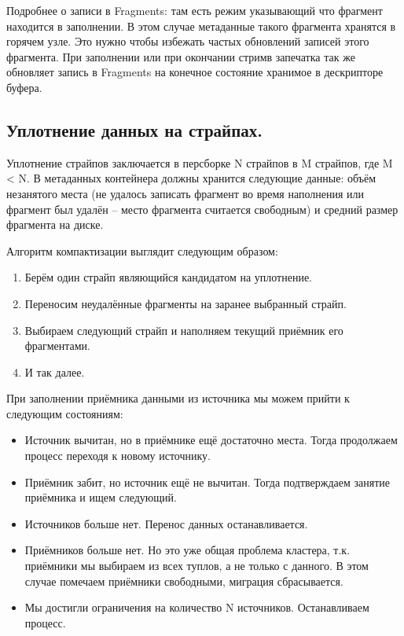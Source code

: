 Подробнее о записи в Fragments: там есть режим указывающий что фрагмент
находится в заполнении. В этом случае метаданные такого фрагмента
хранятся в горячем узле. Это нужно чтобы избежать частых обновлений
записей этого фрагмента. При заполнении или при окончании стримв
запечатка так же обновляет запись в Fragments на конечное состояние
хранимое в дескрипторе буфера.

\subsection{Уплотнение данных на
страйпах.}\label{ux443ux43fux43bux43eux442ux43dux435ux43dux438ux435-ux434ux430ux43dux43dux44bux445-ux43dux430-ux441ux442ux440ux430ux439ux43fux430ux445.}

Уплотнение страйпов заключается в персборке N страйпов в M страйпов, где
M \textless{} N. В метаданных контейнера должны хранится следующие
данные: объём незанятого места (не удалось записать фрагмент во время
наполнения или фрагмент был удалён -- место фрагмента считается
свободным) и средний размер фрагмента на диске.

Алгоритм компактизации выглядит следующим образом:

\begin{enumerate}
\def\labelenumi{\arabic{enumi}.}
\tightlist
\item
  Берём один страйп являющийся кандидатом на уплотнение.
\item
  Переносим неудалённые фрагменты на заранее выбранный страйп.
\item
  Выбираем следующий страйп и наполняем текущий приёмник его
  фрагментами.
\item
  И так далее.
\end{enumerate}

При заполнении приёмника данными из источника мы можем прийти к
следующим состояниям:

\begin{itemize}
\tightlist
\item
  Источник вычитан, но в приёмнике ещё достаточно места. Тогда
  продолжаем процесс переходя к новому источнику.
\item
  Приёмник забит, но источник ещё не вычитан. Тогда подтверждаем занятие
  приёмника и ищем следующий.
\item
  Источников больше нет. Перенос данных останавливается.
\item
  Приёмников больше нет. Но это уже общая проблема кластера, т.к.
  приёмники мы выбираем из всех туплов, а не только с данного. В этом
  случае помечаем приёмники свободными, миграция сбрасывается.
\item
  Мы достигли ограничения на количество N источников. Останавливаем
  процесс.
\end{itemize}

